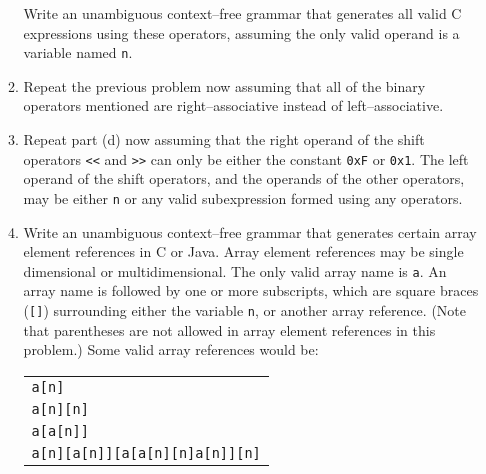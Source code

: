 \documentclass[11pt]{article}
\begin{document}
\begin{enumerate}
\begin{enumerate}
                  Write an unambiguous context--free grammar that generates
                  all valid C expressions using these operators, assuming
                  the only valid operand is a variable named \texttt{n}.

            \item Repeat the previous problem now assuming that all of the
                  binary operators mentioned are right--associative instead
                  of left--associative.

            \item Repeat part (d) now assuming that the right operand of the
                  shift operators \texttt{<<} and \texttt{>>} can only be
                  either the constant \texttt{0xF} or \texttt{0x1}.  The
                  left operand of the shift operators, and the operands of
                  the other operators, may be either \texttt{n} or any
                  valid subexpression formed using any operators.

            \item Write an unambiguous context--free grammar that generates
                  certain array element references in C or Java.  Array
                  element references may be single dimensional or
                  multidimensional.  The only valid array name is
                  \texttt{a}.  An array name is followed by one or more
                  subscripts, which are square braces (\texttt{[]})
                  surrounding either the variable \texttt{n}, or another
                  array reference.  (Note that parentheses are not allowed
                  in array element references in this problem.)  Some
                  valid array references would be:

                  \begin{center}

                    \begin{tabular}[t]{l}

                      \texttt{a[n]}
                        \\

                      \texttt{a[n][n]}
                        \\

                      \texttt{a[a[n]]}
                        \\

                      \texttt{a[n][a[n]][a[a[n][n]a[n]][n]}
                        \\


\end{tabular}
\end{center}
\end{enumerate}
\end{enumerate}
\end{document}

